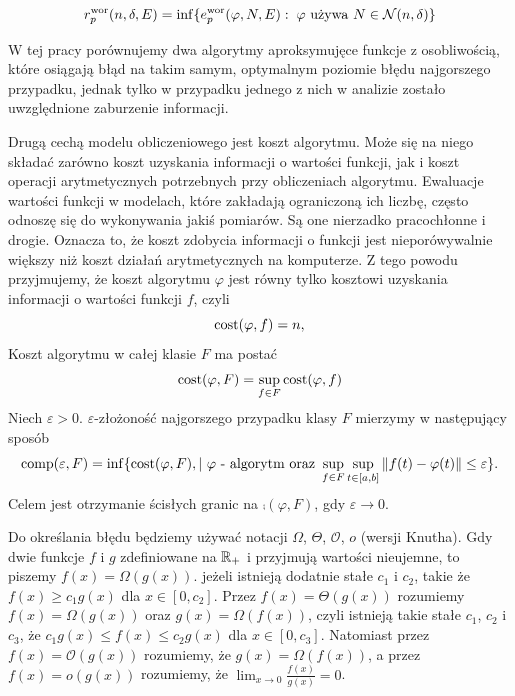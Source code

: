 \documentclass[oik, pdftex, man]{mgrwms}
\begin{document}
    \begin{equation*}
        r^{\mathrm{wor}}_{p}(n, \delta, E) = \inf\{ e_{p}^{\mathrm{wor}}(\varphi, N, E) : \; \varphi \text{ używa } N \in \mathcal{N}(n, \delta) \}
    \end{equation*}


    W tej pracy porównujemy dwa algorytmy aproksymujęce funkcje z osobliwością, które osiągają błąd na takim samym, optymalnym poziomie błędu najgorszego przypadku, jednak tylko w przypadku jednego z nich w analizie zostało uwzględnione zaburzenie informacji.

    Drugą cechą modelu obliczeniowego jest koszt algorytmu. Może się na niego składać zarówno koszt uzyskania informacji o wartości funkcji, jak i koszt operacji arytmetycznych potrzebnych przy obliczeniach algorytmu. Ewaluacje wartości funkcji w modelach, które zakładają ograniczoną ich liczbę, często odnoszę się do wykonywania jakiś pomiarów. Są one nierzadko pracochłonne i drogie. Oznacza to, że koszt zdobycia informacji o funkcji jest nieporówywalnie większy niż koszt działań arytmetycznych na komputerze. Z tego powodu przyjmujemy, że koszt algorytmu $\varphi$ jest równy tylko kosztowi uzyskania informacji o wartości funkcji $f$, czyli
    \begin{equation*}
        \mathrm{cost}(\varphi, f) = n,
    \end{equation*}
    Koszt algorytmu w całej klasie $F$ ma postać
    \begin{equation*}
        \mathrm{cost}(\varphi, F) = \sup_{f \in F} \mathrm{cost}(\varphi, f)
    \end{equation*}
    Niech $\varepsilon > 0$. $\varepsilon$-złożoność najgorszego przypadku klasy $F$ mierzymy w następujący sposób
    \begin{equation*}
        \mathrm{comp}(\varepsilon, F) = \inf \{\mathrm{cost}(\varphi, F), | \text{ $\varphi$ - algorytm oraz } \sup_{f \in F} \sup_{t \in [a,b]} \|f(t) - \varphi(t)\| \leq \varepsilon\}.
    \end{equation*}
    Celem jest otrzymanie ścisłych granic na $\comp(\varphi, F)$, gdy $\varepsilon \rightarrow 0$.

    Do określania błędu będziemy używać notacji $\varOmega$, $\varTheta$, $\mathcal{O}$, $\textit{o}$ (wersji Knutha). Gdy dwie funkcje $f$ i $g$ zdefiniowane na $\mathbb{R}_{+}$ i przyjmują wartości nieujemne, to piszemy $f(x) = \varOmega\left( g(x) \right)$. jeżeli istnieją dodatnie stałe $c_{1}$ i $c_{2}$, takie że $f(x) \geq c_{1} g(x)$ dla $x \in [0, c_{2}]$. Przez $f(x) = \varTheta\left( g(x) \right)$ rozumiemy $f(x) = \varOmega\left( g(x) \right)$ oraz $g(x) = \varOmega\left( f(x) \right)$, czyli istnieją takie stałe $c_{1}$, $c_{2}$ i $c_{3}$, że $c_{1} g(x) \leq f(x) \leq c_{2} g(x)$ dla $x \in [0, c_{3}]$. Natomiast przez $f(x) = \mathcal{O}(g(x))$ rozumiemy, że $g(x) = \varOmega(f(x))$, a przez $f(x) = \textit{o}(g(x))$ rozumiemy, że $\displaystyle \lim_{x \rightarrow 0} \frac{f(x)}{g(x)} = 0$.
\end{document}
